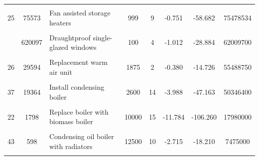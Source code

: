 \begin{table}[!h]
{\begin{tabular}[t]{cc p{6cm} ccccc}
\cellcolor{gray!10}{30} & \cellcolor{gray!10}{76695} & \cellcolor{gray!10}{Fan assisted storage heaters and dual immersion cylinder} & \cellcolor{gray!10}{1124} & \cellcolor{gray!10}{16} & \cellcolor{gray!10}{-0.754} & \cellcolor{gray!10}{-67.301} & \cellcolor{gray!10}{86189841}\\
25 & 75573 & Fan assisted storage heaters & 999 & 9 & -0.751 & -58.682 & 75478534\\
\cellcolor{gray!10}{49} & \cellcolor{gray!10}{99023} & \cellcolor{gray!10}{Heat recovery system for mixer showers} & \cellcolor{gray!10}{655} & \cellcolor{gray!10}{1} & \cellcolor{gray!10}{-0.089} & \cellcolor{gray!10}{-7.041} & \cellcolor{gray!10}{64860065}\\
\addlinespace
10 & 620097 & Draughtproof single-glazed windows & 100 & 4 & -1.012 & -28.884 & 62009700\\
\cellcolor{gray!10}{23} & \cellcolor{gray!10}{5942} & \cellcolor{gray!10}{Wood pellet stove with boiler and radiators} & \cellcolor{gray!10}{10000} & \cellcolor{gray!10}{23} & \cellcolor{gray!10}{-14.619} & \cellcolor{gray!10}{-235.002} & \cellcolor{gray!10}{59420000}\\
26 & 29594 & Replacement warm air unit & 1875 & 2 & -0.380 & -14.726 & 55488750\\
\cellcolor{gray!10}{63} & \cellcolor{gray!10}{122865} & \cellcolor{gray!10}{Party wall insulation} & \cellcolor{gray!10}{450} & \cellcolor{gray!10}{3} & \cellcolor{gray!10}{-0.142} & \cellcolor{gray!10}{-32.712} & \cellcolor{gray!10}{55289250}\\
37 & 19364 & Install condensing boiler & 2600 & 14 & -3.988 & -47.163 & 50346400\\
\addlinespace
\cellcolor{gray!10}{1} & \cellcolor{gray!10}{1148041} & \cellcolor{gray!10}{Insulate hot water cylinder with 80 mm jacket} & \cellcolor{gray!10}{22} & \cellcolor{gray!10}{4} & \cellcolor{gray!10}{-0.366} & \cellcolor{gray!10}{-40.557} & \cellcolor{gray!10}{25830922}\\
22 & 1798 & Replace boiler with biomass boiler & 10000 & 15 & -11.784 & -106.260 & 17980000\\
\cellcolor{gray!10}{9} & \cellcolor{gray!10}{10511} & \cellcolor{gray!10}{Secondary glazing to single glazed windows} & \cellcolor{gray!10}{1250} & \cellcolor{gray!10}{2} & \cellcolor{gray!10}{-0.661} & \cellcolor{gray!10}{-12.716} & \cellcolor{gray!10}{13138750}\\
43 & 598 & Condensing oil boiler with radiators & 12500 & 10 & -2.715 & -18.210 & 7475000\\
\cellcolor{gray!10}{36} & \cellcolor{gray!10}{1324} & \cellcolor{gray!10}{Replace heating unit with condensing unit} & \cellcolor{gray!10}{2600} & \cellcolor{gray!10}{3} & \cellcolor{gray!10}{-0.396} & \cellcolor{gray!10}{-22.771} & \cellcolor{gray!10}{3442400}\\
\bottomrule
\end{tabular}}
\end{table}